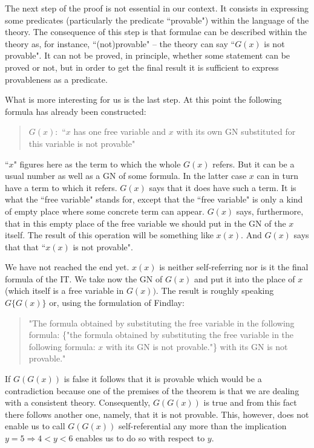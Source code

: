 The next step of the proof is not essential in our context. It consists in expressing some predicates (particularly 
the predicate ``provable") within the language of the theory. The consequence of this step is that formulae can be 
described within the theory as, for instance, ``(not)provable" -- the theory can say 
``$G(x)$ is not provable". It can not 
be proved, in principle, whether some statement can be proved or not, but in order to get the final result it is 
sufficient to express provableness as a predicate.

What is more interesting for us is the last step. At this point the following formula has already been constructed:
\begin{quote}
$G(x):$ ``$x$ has one free variable and $x$ with its own GN substituted for this variable is not provable"
\end{quote}
 ``$x$" figures here as the term to which the whole $G(x)$ refers. But it can be a usual number as well as a GN of 
some formula. In the latter case $x$ can in turn have a term to which it refers. $G(x)$ says that it does have such a 
term. It is what the ``free variable" stands for, except that the ``free variable" is only a kind of empty place where 
some concrete term can appear. $G(x)$ says, furthermore, that in this empty place of the free variable we should put 
in the GN of the $x$ itself. The result of this operation will be something like $x(x).$ 
And $G(x)$ says that that ``$x(x)$ is not provable".

We have not reached the end yet. $x(x)$ is neither self-referring nor is it the final formula of the IT. We take now 
the GN of $G(x)$ and put it into the place of $x$ (which itself is a free variable in 
$G(x))$. The result is roughly speaking $G\{G(x)\}$ or, using the formulation of Findlay:
\begin{quote}
"The formula obtained by substituting the free variable in the following formula: 
\{"the formula obtained by substituting the free variable in the following formula: 
$x$ with its GN is not provable."\} with its GN is not provable."
\end{quote}
If $G(G(x))$ is false it follows that it is provable which would be a contradiction because one of the premises of 
the theorem is that we are dealing with a consistent theory. Consequently, $G(G(x))$ is true and from this fact there 
follows another one, namely, that it is not provable. This, however, does not enable us to call $G(G(x))$ self-referential any more than the implication $y=5 \Rightarrow 4<y<6$ enables
 us to do so with respect to $y$.


